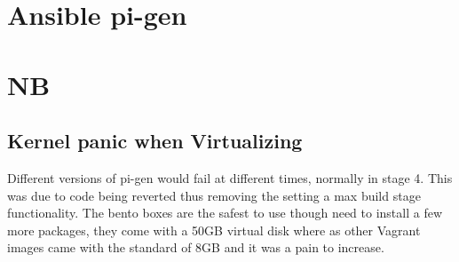 \documentclass[12pt,a4paper]{report}
\begin{document}
\chapter{Ansible pi-gen}

\chapter{NB}
\section{Kernel panic when Virtualizing}
Different versions of pi-gen would fail at different times, normally in stage 4. This was due to code being reverted thus removing the setting a max build stage functionality. The bento boxes are the safest to use though need to install a few more packages, they come with a 50GB virtual disk where as other Vagrant images came with the standard of 8GB and it was a pain to increase. 
\end{document}
